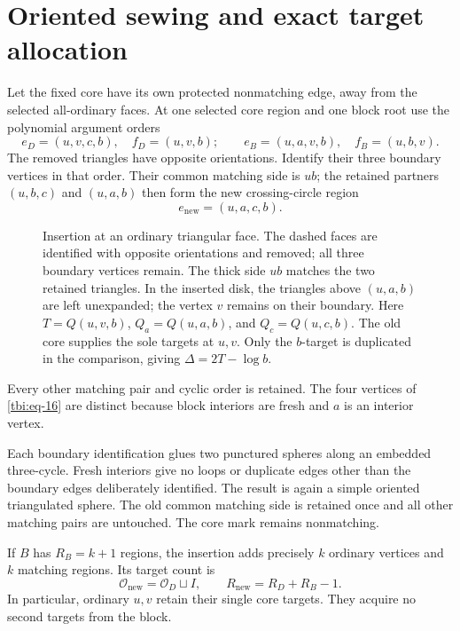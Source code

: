 \section{Oriented sewing and exact target allocation}\label{tbi:sec-5}

Let the fixed core have its own protected nonmatching edge, away from the selected all-ordinary faces. At one selected core region and one block root use the polynomial argument orders
\begin{equation}\label{tbi:eq-15}
e_D=(u,v,c,b),\quad f_D=(u,v,b);
\qquad
e_B=(u,a,v,b),\quad f_B=(u,b,v).
\end{equation}
The removed triangles have opposite orientations. Identify their three
boundary vertices in that order. Their common matching side is
\(ub\); the retained partners \((u,b,c)\) and \((u,a,b)\) then
form the new crossing-circle region
\begin{equation}\label{tbi:eq-16}
e_{\mathrm{new}}=(u,a,c,b).
\end{equation}

\begin{figure}[htbp]
\centering

\caption{Insertion at an ordinary triangular face. The dashed faces are
identified with opposite orientations and removed; all three boundary
vertices remain. The thick side \(ub\) matches the two retained
triangles. In the inserted disk, the triangles above \((u,a,b)\) are
left unexpanded; the vertex \(v\) remains on their boundary.
Here \(T=Q(u,v,b)\), \(Q_a=Q(u,a,b)\), and \(Q_c=Q(u,c,b)\).
The old core supplies the sole targets at \(u,v\).
Only the \(b\)-target is duplicated in the comparison, giving
\(\Delta=2T-\log b\).}
\label{fig:triangular-boundary-insertion}
\end{figure}

Every other matching pair and cyclic order is retained. The four vertices of \eqref{tbi:eq-16} are distinct because block interiors are fresh and \(a\) is an interior vertex.

Each boundary identification glues two punctured spheres along an embedded three-cycle. Fresh interiors give no loops or duplicate edges other than the boundary edges deliberately identified. The result is again a simple oriented triangulated sphere. The old common matching side is retained once and all other matching pairs are untouched. The core mark remains nonmatching.

If \(B\) has \(R_B=k+1\) regions, the insertion adds precisely \(k\) ordinary vertices and \(k\) matching regions. Its target count is
\begin{equation}\label{tbi:eq-17}
\mathcal O_{\mathrm{new}}=\mathcal O_D\sqcup I,\qquad
R_{\mathrm{new}}=R_D+R_B-1.
\end{equation}
In particular, ordinary \(u,v\) retain their single core targets. They acquire no second targets from the block.


